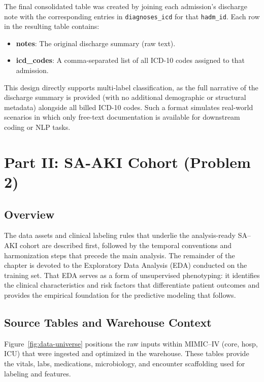 \vspace{5pt}
\noindent
The final consolidated table was created by joining each admission's discharge note with the corresponding entries in \texttt{diagnoses\_icd} for that \texttt{hadm\_id}. Each row in the resulting table contains:
\begin{itemize}
    \item \textbf{notes}: The original discharge summary (raw text).
    \item \textbf{icd\_codes}: A comma-separated list of all ICD-10 codes assigned to that admission.
\end{itemize}

\vspace{5pt}
\noindent
This design directly supports multi-label classification, as the full narrative of the discharge summary is provided (with no additional demographic or structural metadata) alongside all billed ICD-10 codes. Such a format simulates real-world scenarios in which only free-text documentation is available for downstream coding or NLP tasks.

\section{Part II: SA-AKI Cohort (Problem 2)}\label{sec:p2:dataset}

\subsection{Overview}
The data assets and clinical labeling rules that underlie the analysis-ready SA--AKI cohort are described first, followed by the temporal conventions and harmonization steps that precede the main analysis. The remainder of the chapter is devoted to the Exploratory Data Analysis (EDA) conducted on the training set. That EDA serves as a form of unsupervised phenotyping: it identifies the clinical characteristics and risk factors that differentiate patient outcomes and provides the empirical foundation for the predictive modeling that follows.

\subsection{Source Tables and Warehouse Context}
Figure~\ref{fig:data-universe} positions the raw inputs within MIMIC--IV (core, hosp, ICU) that were ingested and optimized in the warehouse. These tables provide the vitals, labs, medications, microbiology, and encounter scaffolding used for labeling and features.


